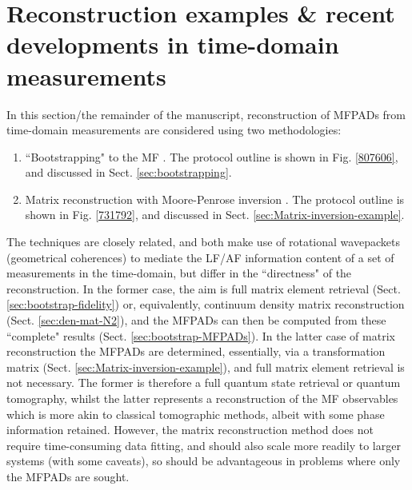 \section{Reconstruction examples \& recent developments in time-domain measurements\label{sec:Recon}}

In this section/the remainder of the manuscript, reconstruction of MFPADs from time-domain measurements are considered using two methodologies:

\begin{enumerate}
\item ``Bootstrapping" to the MF \cite{hockett2018QMP1,hockett2018QMP2,marceau2017MolecularFrameReconstruction}. The protocol outline is shown in Fig. \ref{807606}, and discussed in Sect. \ref{sec:bootstrapping}.
\item Matrix reconstruction with Moore-Penrose inversion \cite{gregory2021MolecularFramePhotoelectron}. The protocol outline is shown in Fig. \ref{731792}, and discussed in Sect. \ref{sec:Matrix-inversion-example}.
\end{enumerate}

The techniques are closely related, and both make use of rotational wavepackets (geometrical coherences) to mediate the LF/AF information content of a set of measurements in the time-domain, but differ in the ``directness" of the reconstruction. In the former case, the aim is full matrix element retrieval (Sect. \ref{sec:bootstrap-fidelity}) or, equivalently, continuum density matrix reconstruction (Sect. \ref{sec:den-mat-N2}), and the MFPADs can then be computed from these ``complete" results (Sect. \ref{sec:bootstrap-MFPADs}). In the latter case of matrix reconstruction the MFPADs are determined, essentially, via a transformation matrix (Sect. \ref{sec:Matrix-inversion-example}), and full matrix element retrieval is not necessary. The former is therefore a full quantum state retrieval or quantum tomography, whilst the latter represents a reconstruction of the MF observables which is more akin to classical tomographic methods, albeit with some phase information retained. %
However, the matrix reconstruction method does not require time-consuming data fitting, and should also scale more readily to larger systems (with some caveats), so should be advantageous in problems where only the MFPADs are sought.

